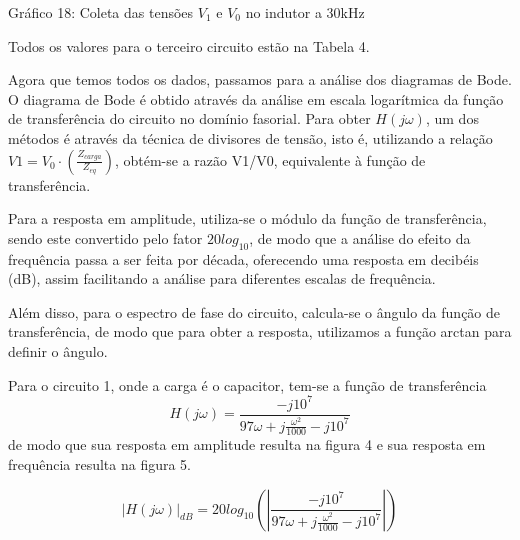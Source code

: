 \documentclass[a4 paper]{article}
\begin{document}
	\begin{center}
	Gráfico 18: Coleta das tensões $V_1$ e $V_0$ no indutor a 30kHz
	\end{center}

Todos os valores para o terceiro circuito estão na Tabela 4.

\newpage


\vspace{1cm}
Agora que temos todos os dados, passamos para a análise dos diagramas de Bode.
O diagrama de Bode é obtido através da análise em escala logarítmica da função de transferência do circuito no domínio fasorial. Para obter $H(j\omega)$, um dos métodos é através da técnica de divisores de tensão, isto é, utilizando a relação $V1 = V_0\cdot\left(\frac{Z_{carga}}{Z_{eq}}\right)$, obtém-se a razão V1/V0, equivalente à função de transferência. 

Para a resposta em amplitude, utiliza-se o módulo da função de transferência, sendo este convertido pelo fator $20log_{10}$, de modo que a análise do efeito da frequência passa a ser feita por década, oferecendo uma resposta em decibéis (dB), assim facilitando a análise para diferentes escalas de frequência.

Além disso, para o espectro de fase do circuito, calcula-se o ângulo da função de transferência, de modo que para obter a resposta, utilizamos a função arctan para definir o ângulo.

Para o circuito 1, onde a carga é o capacitor, tem-se a função de transferência $$H(j\omega)=\frac{-j10^7}{97\omega+j\frac{\omega^2}{1000} -j10^7}$$ de modo que sua resposta em amplitude resulta na figura 4 e sua resposta em frequência resulta na figura 5.

\newpage

\[|H(j\omega)|_{dB}=20log_{10}\left(\left|\frac{-j10^7}{97\omega+j\frac{\omega^2}{1000} -j10^7}\right|\right)\]
\end{document}
